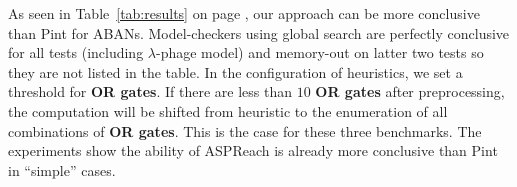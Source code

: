 \begin{table}[ht]
\caption[Comparison of different analyzers]{
Results of the tests on small ($\lambda$-phage) and large (TCR, EGFR) examples from literature. 
``Reachable'', ``Inconclusive'' and ``Unreachable'' give respectively the number of different results of reachability, while ``Total time'' depict the maximum time of the individual computations.}\label{tab:results}
\end{table}

As seen in Table~\ref{tab:results} on page \pageref{tab:results}, our approach can be more conclusive than Pint for ABANs.
Model-checkers using global search are perfectly conclusive for all tests (including $\lambda$-phage model) and memory-out on latter two tests so they are not listed in the table.
In the configuration of heuristics, we set a threshold for \textbf{OR gates}.
If there are less than $10$ \textbf{OR gates} after preprocessing, the computation will be shifted from heuristic to the enumeration of all combinations of \textbf{OR gates}.
This is the case for these three benchmarks. The experiments show the ability of ASPReach is already more conclusive than Pint in ``simple'' cases.
